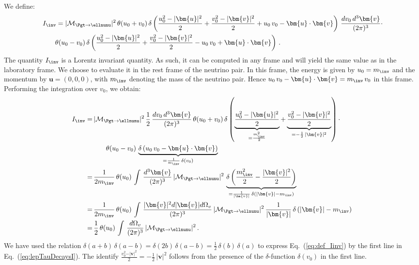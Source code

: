 We define:
\begin{align}
& \, I_{\inv} = \vert\mathcal{M}_{\Pgt \to
  \ellnunu}\vert^{2} \, \theta(u_{0} + v_{0}) \, \delta
\left( \frac{u_{0}^{2} - \vert\bm{u}\vert^{2}}{2} + \frac{v_{0}^{2} - \vert\bm{v}\vert^{2}}{2} +
  u_{0} \, v_{0} - \bm{u} \cdot \bm{v} \right) \, 
  \frac{dv_{0} \, d^{3}\bm{v}}{(2\pi)^{3}} \cdot \nonumber \\
 & \qquad
  \theta(u_{0}
  - v_{0}) \, \delta \left( \frac{u_{0}^{2} - \vert\bm{u}\vert^{2}}{2} +
    \frac{v_{0}^{2} - \vert\bm{v}\vert^{2}}{2} - u_{0} \, v_{0} + \bm{u}
    \cdot \bm{v} \right) \, .
\label{eq:def_Iinv}
\end{align}
The quantity $I_{\inv}$ is a Lorentz invariant quantity. 
As such, it can be computed in any frame and will yield the same value as in the laboratory frame.
We choose to evaluate it in the rest frame of the neutrino pair.
In this frame, the energy is given by $u_{0} = m_{\inv}$ 
and the momentum by $\bm{u} = ( 0, 0, 0 )$, with $m_{\inv}$ denoting
the mass of the neutrino pair.
Hence $u_{0} \, v_{0} - \bm{u} \cdot \bm{v} = m_{\inv} \, v_{0} $ in this frame.
Performing the integration over $v_{0}$, we obtain:
\begin{align}
I_{\inv}
= & \, \vert\mathcal{M}_{\Pgt \to
  \ellnunu}\vert^{2} \, \frac{1}{2} \, \frac{dv_{0} \, d^{3}\bm{v}}{(2\pi)^{3}} \, \theta ( u_{0} + v_{0} ) \, 
    \delta \left( \underbrace{\frac{u_{0}^{2} - \vert\bm{u}\vert^{2}}{2}}_{=
        \frac{m^{2}_{\inv}}{2}} + \underbrace{\frac{v_{0}^{2} -
        \vert\bm{v}\vert^{2}}{2}}_{= -\frac{1}{2} \, \vert\bm{v}\vert^{2}} \right)
    \cdot \nonumber \\
& \qquad
    \theta ( u_{0} - v_{0} ) \, \underbrace{\delta \left(
        u_{0} \, v_{0} - \bm{u} \cdot \bm{v} \right)}_{= \frac{1}{m_{\inv}} \, \delta ( v_{0} )} \nonumber \\
= & \, \frac{1}{2 m_{\inv}} \, \theta ( u_{0} ) \, \int \, \frac{d^{3}\bm{v}}{(2\pi)^{3}} \, 
  \vert\mathcal{M}_{\Pgt \to
  \ellnunu}\vert^{2} \, \underbrace{\delta \left( \frac{m^{2}_{\inv}}{2} - \frac{\vert\bm{v}\vert^{2}}{2} \right)}_{
    = \frac{1}{\vert\bm{v}\vert} \, \delta \left( \vert\bm{v}\vert - m_{\inv} \right)} \nonumber \\
= & \, \frac{1}{2 m_{\inv}} \, \theta ( u_{0} ) \, \int \, \frac{\vert\bm{v}\vert^2 d\vert\bm{v}\vert d\Omega_{v}}{(2\pi)^{3}} \, 
  \vert\mathcal{M}_{\Pgt \to
  \ellnunu}\vert^{2} \, \frac{1}{\vert\bm{v}\vert} \, \delta \left( \vert\bm{v}\vert - m_{\inv} \right) \nonumber \\
= & \, \frac{1}{2} \, \theta ( u_{0} ) \, \int \, \frac{d\Omega_{v}}{(2\pi)^{3}} \, \vert\mathcal{M}_{\Pgt \to
  \ellnunu}\vert^{2} \, . 
\label{eq:lepTauDecaysI}
\end{align}
We have used the relation $\delta(a + b) \, \delta(a - b) = \delta(2b) \, \delta(a - b) = \frac{1}{2} \, \delta(b) \, \delta(a)$ 
to express Eq.~(\ref{eq:def_Iinv}) by the first line in
Eq.~(\ref{eq:lepTauDecaysI}).
The identify $\frac{v_{0}^{2} - \vert\bm{v}\vert^{2}}{2} =
-\frac{1}{2} \, \vert\bm{v}\vert^{2}$ follows from the presence of the 
$\delta$-function $\delta ( v_{0} )$ in the first line.

